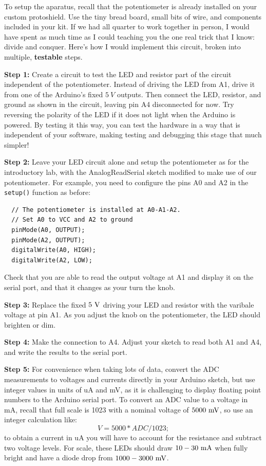 \documentclass[12pt]{article}
\begin{document}
To setup the aparatus, recall that the potentiometer is already
installed on your custom protoshield.  Use the tiny bread board, small
bits of wire, and components included in your kit.  If we had all
quarter to work together in person, I would have spent as much time as
I could teaching you the one real trick that I know: divide and
conquer.  Here's how I would implement this circuit, broken into
multiple, {\bf testable} steps.

\vskip 1cm
\noindent
{\bf Step 1:} Create a circuit to test the LED and resistor part of
the circuit independent of the potentiometer.  Instead of driving the
LED from A1, drive it from one of the Arduino's fixed $5~V$ outputs.
Then connect the LED, resistor, and ground as shown in the circuit,
leaving pin A4 disconnected for now.  Try reversing the polarity
of the LED if it does not light when the Arduino is powered.  By
testing it this way, you can test the hardware in a way that is
independent of your software, making testing and debugging this stage
that much simpler!

\vskip 1cm
\noindent
{\bf Step 2:} Leave your LED circuit alone and setup the potentiometer
as for the introductory lab, with the AnalogReadSerial sketch modified
to make use of our potentiometer.  For example, you need to configure
the pins A0 and A2 in the {\tt setup()} function as before:
\begin{verbatim}    
  // The potentiometer is installed at A0-A1-A2.
  // Set A0 to VCC and A2 to ground
  pinMode(A0, OUTPUT);
  pinMode(A2, OUTPUT);
  digitalWrite(A0, HIGH);
  digitalWrite(A2, LOW);  
\end{verbatim}
Check that you are able to read the output voltage at A1 and display
it on the serial port, and that it changes as your turn the knob.

\vskip 1cm
\noindent
{\bf Step 3:} Replace the fixed $5~\rm V$ driving your LED and
resistor with the varibale voltage at pin A1.  As you adjust the knob
on the potentiometer, the LED should brighten or dim.

\vskip 1cm
\noindent
{\bf Step 4:} Make the connection to A4.  Adjust your sketch to read
both A1 and A4, and write the results to the serial port.

\vskip 1cm
\noindent
{\bf Step 5:} For convenience when taking lots of data, convert the
ADC measurements to voltages and currents directly in your Arduino
sketch, but use integer values in units of uA and mV, as it is
challenging to display floating point numbers to the Arduino serial
port.  To convert an ADC value to a voltage in mA, recall that full
scale is 1023 with a nominal voltage of $5000~\rm mV$, so use an integer calculation like:
\begin{displaymath}
V = 5000*ADC/1023;
\end{displaymath}
to obtain a current in uA you will have to account for the resistance
and subtract two voltage levels.  For scale, these LEDs should draw
$10-30~\rm mA$ when fully bright and have a diode drop from
$1000-3000~\rm mV$.
\end{document}
